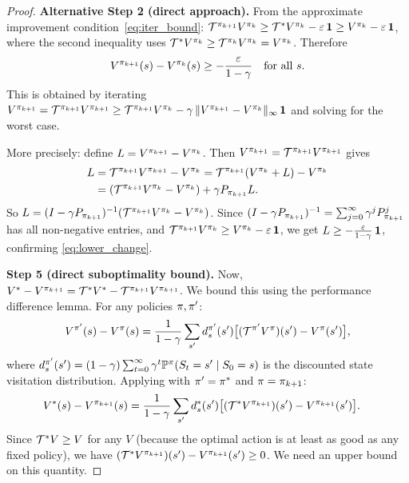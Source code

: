 \documentclass[11pt,a4paper]{article}
\begin{document}
\begin{proof}
\textbf{Alternative Step 2 (direct approach).}
From the approximate improvement condition~\eqref{eq:iter_bound}:
$\mathcal{T}^{\pi_{k+1}} V^{\pi_k}
\geq \mathcal{T}^* V^{\pi_k} - \varepsilon\,\mathbf{1}
\geq V^{\pi_k} - \varepsilon\,\mathbf{1}$,
where the second inequality uses
$\mathcal{T}^* V^{\pi_k} \geq \mathcal{T}^{\pi_k} V^{\pi_k}
= V^{\pi_k}$. Therefore
\begin{equation}
  V^{\pi_{k+1}}(s) - V^{\pi_k}(s)
  \geq -\frac{\varepsilon}{1-\gamma}
  \quad \text{for all } s.
  \label{eq:lower_change}
\end{equation}
This is obtained by iterating
$V^{\pi_{k+1}} = \mathcal{T}^{\pi_{k+1}} V^{\pi_{k+1}}
\geq \mathcal{T}^{\pi_{k+1}} V^{\pi_k}
- \gamma\,\|V^{\pi_{k+1}} - V^{\pi_k}\|_\infty\,\mathbf{1}$
and solving for the worst case.

More precisely: define $L = V^{\pi_{k+1}} - V^{\pi_k}$.
Then $V^{\pi_{k+1}} = \mathcal{T}^{\pi_{k+1}} V^{\pi_{k+1}}$
gives
\begin{align}
  L &= \mathcal{T}^{\pi_{k+1}} V^{\pi_{k+1}} - V^{\pi_k}
  = \mathcal{T}^{\pi_{k+1}} (V^{\pi_k} + L) - V^{\pi_k}
  \nonumber\\
  &= (\mathcal{T}^{\pi_{k+1}} V^{\pi_k} - V^{\pi_k})
  + \gamma P_{\pi_{k+1}} L.
\end{align}
So $L = (I - \gamma P_{\pi_{k+1}})^{-1}
(\mathcal{T}^{\pi_{k+1}} V^{\pi_k} - V^{\pi_k})$.
Since $(I - \gamma P_{\pi_{k+1}})^{-1}
= \sum_{j=0}^\infty \gamma^j P_{\pi_{k+1}}^j$ has all
non-negative entries, and
$\mathcal{T}^{\pi_{k+1}} V^{\pi_k}
\geq V^{\pi_k} - \varepsilon\,\mathbf{1}$, we get
$L \geq -\frac{\varepsilon}{1-\gamma}\,\mathbf{1}$, confirming
\eqref{eq:lower_change}.

\textbf{Step 5 (direct suboptimality bound).}
Now, $V^* - V^{\pi_{k+1}}
= \mathcal{T}^* V^* - \mathcal{T}^{\pi_{k+1}} V^{\pi_{k+1}}$. We
bound this using the performance difference lemma. For any policies
$\pi, \pi'$:
\begin{equation}
  V^{\pi'}(s) - V^\pi(s)
  = \frac{1}{1-\gamma}
  \sum_{s'} d_{s}^{\pi'}(s')
  \bigl[(\mathcal{T}^{\pi'} V^\pi)(s') - V^\pi(s')\bigr],
  \label{eq:perf_diff}
\end{equation}
where $d_s^{\pi'}(s')
= (1-\gamma)\sum_{t=0}^\infty \gamma^t
\mathbb{P}^\pi(S_t = s' \mid S_0 = s)$ is the discounted state
visitation distribution. Applying with $\pi' = \pi^*$
and $\pi = \pi_{k+1}$:
\begin{align}
  V^*(s) - V^{\pi_{k+1}}(s)
  &= \frac{1}{1-\gamma}
  \sum_{s'} d_s^*(s')
  \bigl[(\mathcal{T}^* V^{\pi_{k+1}})(s')
  - V^{\pi_{k+1}}(s')\bigr].
  \label{eq:perf_diff_applied}
\end{align}
Since $\mathcal{T}^* V \geq V$ for any $V$ (because the optimal
action is at least as good as any fixed policy), we have
$(\mathcal{T}^* V^{\pi_{k+1}})(s') - V^{\pi_{k+1}}(s') \geq 0$.
We need an upper bound on this quantity.


\end{proof}
\end{document}

